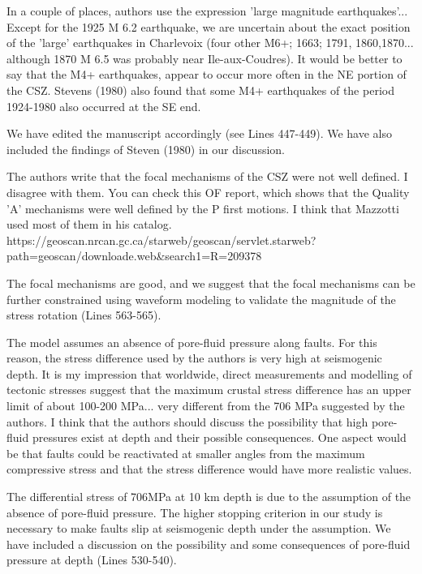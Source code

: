 \documentclass[12pt]{article}
\begin{document}
\begin{response}{In a couple of places, authors use the expression 'large magnitude earthquakes'... Except for the 1925 M 6.2 earthquake, we are uncertain about the exact position of the 'large' earthquakes in Charlevoix (four other M6+; 1663; 1791, 1860,1870... although 1870 M 6.5 was probably near Ile-aux-Coudres). It would be better to say that the M4+ earthquakes, appear to occur more often in the NE portion of the CSZ. Stevens (1980) also found that some M4+ earthquakes of the period 1924-1980 also occurred at the SE end.}

  We have edited the manuscript accordingly (see Lines 447-449). We have also included the findings of Steven (1980) in our discussion.
\end{response}

\begin{response}{The authors write that the focal mechanisms of the CSZ were not well defined. I disagree with them. You can check this OF report, which shows that the Quality 'A' mechanisms were well defined by the P first motions. I think that Mazzotti used most of them in his catalog.
https://geoscan.nrcan.gc.ca/starweb/geoscan/servlet.starweb?
path=geoscan/downloade.web\&search1=R=209378}

 The focal mechanisms are good, and we suggest that the focal mechanisms can be further constrained using waveform modeling to validate the magnitude of the stress rotation (Lines 563-565).
\end{response}

\begin{response}{The model assumes an absence of pore-fluid pressure along faults. For this reason, the stress difference used by the authors is very high at seismogenic depth. It is my impression that worldwide, direct measurements and modelling of tectonic stresses suggest that the maximum crustal stress difference has an upper limit of about 100-200 MPa... very different from the 706 MPa suggested by the authors.
I think that the authors should discuss the possibility that high pore-fluid pressures exist at depth and their possible consequences. One aspect would be that faults could be reactivated at smaller angles from the maximum compressive stress and that the stress difference would have more realistic values.}

  The differential stress of 706MPa at 10 km depth is due to the assumption of the absence of pore-fluid pressure. The higher stopping criterion in our study is necessary to make faults slip at seismogenic depth under the assumption. We have included a discussion on the possibility and some consequences of pore-fluid pressure at depth (Lines 530-540).
\end{response}
\end{document}
